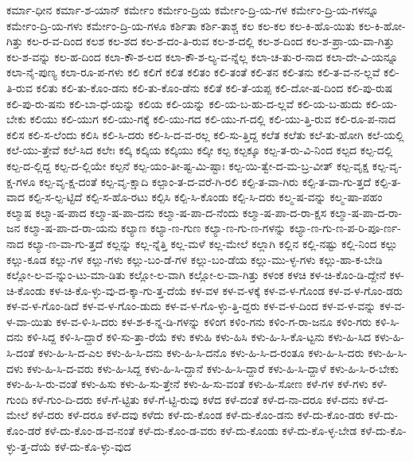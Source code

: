 {ಕರ್ಮಾ-ಧೀನ
ಕರ್ಮಾ-ಶ-ಯಾನ್
ಕರ್ಮೇಂ
ಕರ್ಮೇಂ-ದ್ರಿಯ
ಕರ್ಮೇಂ-ದ್ರಿ-ಯ-ಗಳ
ಕರ್ಮೇಂ-ದ್ರಿ-ಯ-ಗಳನ್ನೂ
ಕರ್ಮೇಂ-ದ್ರಿ-ಯ-ಗಳು
ಕರ್ಮೇಂ-ದ್ರಿ-ಯ-ಗಳೂ
ಕರ್ಶಿತಾ
ಕರ್ಶಿ-ತಾಶ್ಚ
ಕಲ
ಕಲ-ಕಲ
ಕಲ-ಕಿ-ಹೊ-ಯಿತು
ಕಲ-ಕಿ-ಹೋ-ಗಿತ್ತು
ಕಲ-ರ-ವ-ದಿಂದ
ಕಲಶ
ಕಲ-ಶದ
ಕಲ-ಶ-ದಂ-ತಿ-ರುವ
ಕಲ-ಶ-ದಲ್ಲಿ
ಕಲ-ಶ-ದಿಂದ
ಕಲ-ಶ-ಪ್ರಾ-ಯ-ವಾ-ಗಿತ್ತು
ಕಲ-ಶ-ವನ್ನು
ಕಲ-ಹ-ದಿಂದ
ಕಲಾ-ಕೌ-ಶ-ಲದ
ಕಲಾ-ಕೌ-ಶ-ಲ್ಯ-ವ-ನ್ನೆಲ್ಲ
ಕಲಾ-ಚ-ತು-ರ-ನಾದ
ಕಲಾ-ದೇ-ವಿ-ಯನ್ನೂ
ಕಲಾ-ನೈ-ಪುಣ್ಯ
ಕಲಾ-ರೂ-ಪ-ಗಳು
ಕಲಿ
ಕಲಿಗೆ
ಕಲಿತ
ಕಲಿತಂ
ಕಲಿ-ತಂತೆ
ಕಲಿ-ತನ
ಕಲಿ-ತನು
ಕಲಿ-ತ-ವ-ನ-ಲ್ಲವೆ
ಕಲಿ-ತಿ-ರುವ
ಕಲಿತು
ಕಲಿ-ತು-ಕೊಂ-ಡನು
ಕಲಿ-ತು-ಕೊಂ-ಡೆನು
ಕಲಿತೆ
ಕಲಿ-ತೆ-ಯಪ್ಪ
ಕಲಿ-ದೋ-ಷ-ದಿಂದ
ಕಲಿ-ಪು-ರುಷ
ಕಲಿ-ಪು-ರು-ಷನು
ಕಲಿ-ಬಾ-ಧೆ-ಯನ್ನು
ಕಲಿಯ
ಕಲಿ-ಯನ್ನು
ಕಲಿ-ಯ-ಬ-ಹು-ದ-ಲ್ಲವೆ
ಕಲಿ-ಯ-ಬ-ಹುದು
ಕಲಿ-ಯ-ಬೇಕು
ಕಲಿಯು
ಕಲಿ-ಯುಗ
ಕಲಿ-ಯು-ಗಕ್ಕೆ
ಕಲಿ-ಯು-ಗದ
ಕಲಿ-ಯು-ಗ-ದಲ್ಲಿ
ಕಲಿ-ಯು-ತ್ತಿ-ರುವ
ಕಲಿ-ರೂ-ಪ-ನಾದ
ಕಲಿಸ
ಕಲಿ-ಸ-ಲೆಂದು
ಕಲಿಸಿ
ಕಲಿ-ಸಿ-ದರು
ಕಲಿ-ಸಿ-ದ-ವ-ರಲ್ಲ
ಕಲಿ-ಸು-ತ್ತಿದ್ದ
ಕಲೆತ
ಕಲೆತು
ಕಲೆ-ತು-ಹೋಗಿ
ಕಲೆ-ಯಲ್ಲಿ
ಕಲೆ-ಯು-ತ್ತೇವೆ
ಕಲೆ-ಸಿದ
ಕಲೇಃ
ಕಲ್ಕಿ
ಕಲ್ಕಿಯ
ಕಲ್ಕಿಯು
ಕಲ್ಕೀ
ಕಲ್ಪ
ಕಲ್ಪಕ್ಕೂ
ಕಲ್ಪ-ತ-ರು-ವಿ-ನಿಂದ
ಕಲ್ಪದ
ಕಲ್ಪ-ದಲ್ಲಿ
ಕಲ್ಪ-ದ-ಲ್ಲಿದ್ದ
ಕಲ್ಪ-ದ-ಲ್ಲಿಯೇ
ಕಲ್ಪನೆ
ಕಲ್ಪ-ಯಂ-ತೀ-ಷ್ಟ-ಮಿ-ಷ್ಟಾಃ
ಕಲ್ಪ-ಯಿ-ತ್ವೇ-ದ-ಮ-ಬ್ರ-ವೀತ್
ಕಲ್ಪ-ವೃಕ್ಷ
ಕಲ್ಪ-ವೃ-ಕ್ಷ-ಗಳೂ
ಕಲ್ಪ-ವೃ-ಕ್ಷ-ದಂತೆ
ಕಲ್ಪ-ವೃ-ಕ್ಷಾದಿ
ಕಲ್ಪಾಂ-ತ-ದ-ವರೆ-ಗಿ-ರಲಿ
ಕಲ್ಪಿ-ತ-ವಾ-ಗಿರು
ಕಲ್ಪಿ-ತ-ವಾ-ಗು-ತ್ತದೆ
ಕಲ್ಪಿ-ತ-ವಾದ
ಕಲ್ಪಿ-ಸ-ಲ್ಪ-ಟ್ಟಿದೆ
ಕಲ್ಪಿ-ಸ-ಹೊ-ರಟು
ಕಲ್ಪಿಸಿ
ಕಲ್ಪಿ-ಸಿ-ಕೊಂಡು
ಕಲ್ಪಿ-ಸಿ-ದರು
ಕಲ್ಮ-ಷ-ವನ್ನು
ಕಲ್ಮ-ಷಾ-ಪಹಂ
ಕಲ್ಮಾಷ
ಕಲ್ಮಾ-ಷ-ಪಾದ
ಕಲ್ಮಾ-ಷ-ಪಾ-ದನು
ಕಲ್ಮಾ-ಷ-ಪಾ-ದ-ನೆಂದು
ಕಲ್ಮಾ-ಷ-ಪಾ-ದ-ರಾ-ಕ್ಷಸ
ಕಲ್ಮಾ-ಷ-ಪಾ-ದ-ರಾ-ಜನ
ಕಲ್ಮಾ-ಷ-ಪಾ-ದ-ರಾ-ಯನು
ಕಲ್ಯಾಣ
ಕಲ್ಯಾ-ಣ-ಗುಣ
ಕಲ್ಯಾ-ಣ-ಗು-ಣ-ಗಳನ್ನು
ಕಲ್ಯಾ-ಣ-ಗು-ಣ-ಪ-ರಿ-ಪೂ-ರ್ಣ-ನಾದ
ಕಲ್ಯಾ-ಣ-ವಾ-ಗು-ತ್ತದೆ
ಕಲ್ಲನ್ನು
ಕಲ್ಲ-ನ್ನೆತ್ತಿ
ಕಲ್ಲ-ಮಳೆ
ಕಲ್ಲ-ಮೇಲೆ
ಕಲ್ಲಾಗಿ
ಕಲ್ಲಿನ
ಕಲ್ಲಿ-ನಷ್ಟು
ಕಲ್ಲಿ-ನಿಂದ
ಕಲ್ಲು
ಕಲ್ಲು-ಕೂಡ
ಕಲ್ಲು-ಗಳ
ಕಲ್ಲು-ಗಳು
ಕಲ್ಲು-ಬಂ-ಡೆ-ಗಳ
ಕಲ್ಲು-ಬಂ-ಡೆಯ
ಕಲ್ಲು-ಮು-ಳ್ಳ-ಗಳು
ಕಲ್ಲು-ಹಾ-ಕ-ಬೇಡಿ
ಕಲ್ಲೋ-ಲ-ವ-ನ್ನುಂ-ಟು-ಮಾ-ಡಿತು
ಕಲ್ಲೋ-ಲ-ವಾಗಿ
ಕಲ್ಲೋ-ಲ-ವಾ-ಗಿತ್ತು
ಕಳಂಕ
ಕಳಚಿ
ಕಳ-ಚಿ-ಕೊಂ-ಡಿ-ದ್ದೇನೆ
ಕಳ-ಚಿ-ಕೊಂಡು
ಕಳ-ಚಿ-ಕೊ-ಳ್ಳು-ವು-ದ-ಕ್ಕಾ-ಗು-ತ್ತ-ದೆಯೆ
ಕಳ-ವಳ
ಕಳ-ವ-ಳಕ್ಕೆ
ಕಳ-ವ-ಳ-ಗೊಂಡ
ಕಳ-ವ-ಳ-ಗೊಂ-ಡರು
ಕಳ-ವ-ಳ-ಗೊಂ-ಡಿದೆ
ಕಳ-ವ-ಳ-ಗೊಂ-ಡುದು
ಕಳ-ವ-ಳ-ಗೊ-ಳ್ಳು-ತ್ತಿ-ದ್ದರು
ಕಳ-ವ-ಳ-ದಿಂದ
ಕಳ-ವ-ಳ-ವನ್ನು
ಕಳ-ವ-ಳ-ವಾ-ಯಿತು
ಕಳ-ವ-ಳಿ-ಸಿ-ದರು
ಕಳ-ಶ-ಕ-ನ್ನ-ಡಿ-ಗಳನ್ನು
ಕಳಿಂಗ
ಕಳಿಂ-ಗನು
ಕಳಿಂ-ಗ-ರಾ-ಜನೂ
ಕಳಿಂ-ಗರು
ಕಳಿ-ಸಿ-ದನು
ಕಳಿ-ಸಿದ್ದ
ಕಳಿ-ಸಿ-ದ್ದಾರೆ
ಕಳಿ-ಸು-ತ್ತಾ-ರೆಯೆ
ಕಳು
ಕಳುಹಿ
ಕಳು-ಹಿಸಿ
ಕಳು-ಹಿ-ಸಿ-ಕೊ-ಟ್ಟನು
ಕಳು-ಹಿ-ಸಿದ
ಕಳು-ಹಿ-ಸಿ-ದಂತೆ
ಕಳು-ಹಿ-ಸಿ-ದ-ಎಲ
ಕಳು-ಹಿ-ಸಿ-ದನು
ಕಳು-ಹಿ-ಸಿ-ದನೊ
ಕಳು-ಹಿ-ಸಿ-ದ-ರಂತೂ
ಕಳು-ಹಿ-ಸಿ-ದರು
ಕಳು-ಹಿ-ಸಿ-ದಳು
ಕಳು-ಹಿ-ಸಿ-ದ-ವರು
ಕಳು-ಹಿ-ಸಿದ್ದ
ಕಳು-ಹಿ-ಸಿ-ದ್ದಾನೆ
ಕಳು-ಹಿ-ಸಿ-ದ್ದಾರೆ
ಕಳು-ಹಿ-ಸಿ-ದ್ದಾಳೆ
ಕಳು-ಹಿ-ಸಿ-ರ-ಬೇಕು
ಕಳು-ಹಿ-ಸಿ-ರು-ವಂತೆ
ಕಳು-ಹಿಸು
ಕಳು-ಹಿ-ಸು-ತ್ತೇನೆ
ಕಳು-ಹಿ-ಸು-ವಂತೆ
ಕಳು-ಹಿ-ಸೋಣ
ಕಳೆ-ಗಳ
ಕಳೆ-ಗಳು
ಕಳೆ-ಗುಂದಿ
ಕಳೆ-ಗುಂ-ದಿ-ದರು
ಕಳೆ-ಗೆ-ಟ್ಟಿತು
ಕಳೆ-ಗೆ-ಟ್ಟಿ-ರುವು
ಕಳೆದ
ಕಳೆ-ದಂತೆ
ಕಳೆ-ದ-ನಾ-ದರೂ
ಕಳೆ-ದನು
ಕಳೆ-ದ-ಮೇಲೆ
ಕಳೆ-ದರು
ಕಳೆ-ದರೂ
ಕಳೆ-ದವು
ಕಳೆದು
ಕಳೆ-ದು-ಕೊಂಡ
ಕಳೆ-ದು-ಕೊಂ-ಡನು
ಕಳೆ-ದು-ಕೊಂ-ಡರು
ಕಳೆ-ದು-ಕೊಂ-ಡರೆ
ಕಳೆ-ದು-ಕೊಂ-ಡ-ವ-ನಂತೆ
ಕಳೆ-ದು-ಕೊಂ-ಡ-ವರು
ಕಳೆ-ದು-ಕೊಂಡು
ಕಳೆ-ದು-ಕೊ-ಳ್ಳ-ಬೇಡ
ಕಳೆ-ದು-ಕೊ-ಳ್ಳು-ತ್ತ-ದೆಯೆ
ಕಳೆ-ದು-ಕೊ-ಳ್ಳು-ವುದ
}
